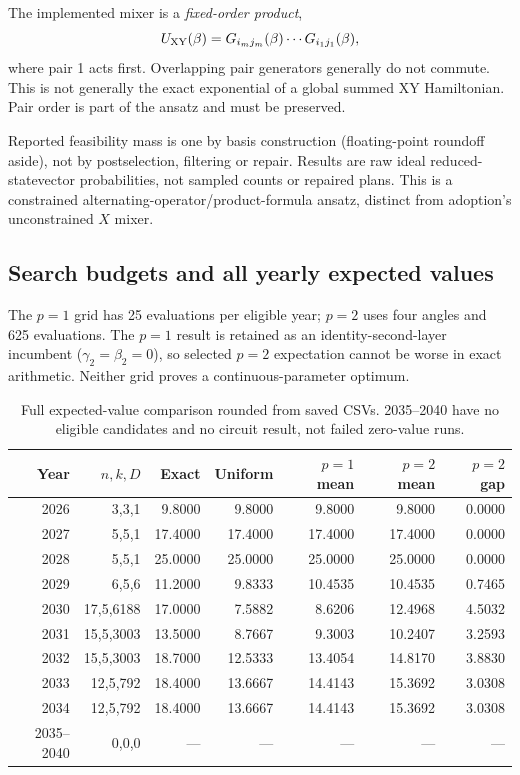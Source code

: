 \documentclass[11pt,letterpaper]{article}
\begin{document}
The implemented mixer is a \emph{fixed-order product},
\begin{equation}
 U_{\rm XY}(\beta)=G_{i_mj_m}(\beta)\cdots G_{i_1j_1}(\beta),
\end{equation}
where pair 1 acts first. Overlapping pair generators generally do not commute. This is not generally the exact exponential of a global summed XY Hamiltonian. Pair order is part of the ansatz and must be preserved.

Reported feasibility mass is one by basis construction (floating-point roundoff aside), not by postselection, filtering or repair. Results are raw ideal reduced-statevector probabilities, not sampled counts or repaired plans. This is a constrained alternating-operator/product-formula ansatz, distinct from adoption's unconstrained $X$ mixer.
\subsection{Search budgets and all yearly expected values}\label{sec:targetmetrics}
The $p=1$ grid has 25 evaluations per eligible year; $p=2$ uses four angles and 625 evaluations. The $p=1$ result is retained as an identity-second-layer incumbent ($\gamma_2=\beta_2=0$), so selected $p=2$ expectation cannot be worse in exact arithmetic. Neither grid proves a continuous-parameter optimum.

\begin{table}[H]\centering\small
\begin{tabular}{@{}rrrrrrr@{}}\toprule
Year & $n,k,D$ & Exact & Uniform & $p=1$ mean & $p=2$ mean & $p=2$ gap\\\midrule
2026 & 3,3,1 & 9.8000 & 9.8000 & 9.8000 & 9.8000 & 0.0000 \\
2027 & 5,5,1 & 17.4000 & 17.4000 & 17.4000 & 17.4000 & 0.0000 \\
2028 & 5,5,1 & 25.0000 & 25.0000 & 25.0000 & 25.0000 & 0.0000 \\
2029 & 6,5,6 & 11.2000 & 9.8333 & 10.4535 & 10.4535 & 0.7465 \\
2030 & 17,5,6188 & 17.0000 & 7.5882 & 8.6206 & 12.4968 & 4.5032 \\
2031 & 15,5,3003 & 13.5000 & 8.7667 & 9.3003 & 10.2407 & 3.2593 \\
2032 & 15,5,3003 & 18.7000 & 12.5333 & 13.4054 & 14.8170 & 3.8830 \\
2033 & 12,5,792 & 18.4000 & 13.6667 & 14.4143 & 15.3692 & 3.0308 \\
2034 & 12,5,792 & 18.4000 & 13.6667 & 14.4143 & 15.3692 & 3.0308 \\
2035--2040 & 0,0,0 & --- & --- & --- & --- & --- \\
\bottomrule\end{tabular}
\caption{Full expected-value comparison rounded from saved CSVs. 2035--2040 have no eligible candidates and no circuit result, not failed zero-value runs.}
\end{table}
\end{document}

